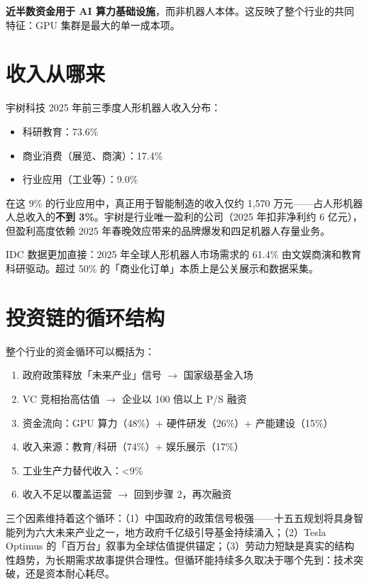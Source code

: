 \textbf{近半数资金用于 AI 算力基础设施}，而非机器人本体。这反映了整个行业的共同特征：GPU 集群是最大的单一成本项。

\section{收入从哪来}

\begin{warnbox}[收入的真相]
宇树科技 2025 年前三季度人形机器人收入分布\cite{unitree2026ipo}：
\begin{itemize}
  \item 科研教育：73.6\%
  \item 商业消费（展览、商演）：17.4\%
  \item 行业应用（工业等）：9.0\%
\end{itemize}
在这 9\% 的行业应用中，真正用于智能制造的收入仅约 1,570 万元——占人形机器人总收入的\textbf{不到 3\%}。宇树是行业唯一盈利的公司（2025 年扣非净利约 6 亿元），但盈利高度依赖 2025 年春晚效应带来的品牌爆发和四足机器人存量业务。
\end{warnbox}

IDC 数据更加直接：2025 年全球人形机器人市场需求的 61.4\% 由文娱商演和教育科研驱动\cite{idc2025humanoid}。超过 50\% 的「商业化订单」本质上是公关展示和数据采集\cite{ubs2026humanoid}。

\section{投资链的循环结构}

整个行业的资金循环可以概括为：

\begin{enumerate}
  \item 政府政策释放「未来产业」信号 $\to$ 国家级基金入场
  \item VC 竞相抬高估值 $\to$ 企业以 100 倍以上 P/S 融资
  \item 资金流向：GPU 算力（48\%）+ 硬件研发（26\%）+ 产能建设（15\%）
  \item 收入来源：教育/科研（74\%）+ 娱乐展示（17\%）
  \item 工业生产力替代收入：\textless{}9\%
  \item 收入不足以覆盖运营 $\to$ 回到步骤 2，再次融资
\end{enumerate}

\begin{whybox}[为什么这个循环还没有崩溃？]
三个因素维持着这个循环：（1）中国政府的政策信号极强——十五五规划将具身智能列为六大未来产业之一\cite{fifteenfive2026}，地方政府千亿级引导基金持续涌入；（2）Tesla Optimus 的「百万台」叙事为全球估值提供锚定；（3）劳动力短缺是真实的结构性趋势，为长期需求故事提供合理性。但循环能持续多久取决于哪个先到：技术突破，还是资本耐心耗尽。
\end{whybox}
